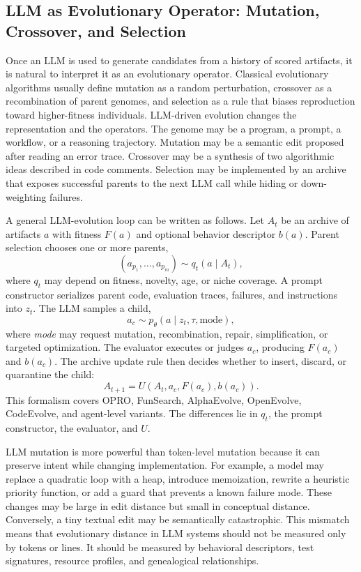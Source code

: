 \subsection{LLM as Evolutionary Operator: Mutation, Crossover, and Selection}
\label{subsec:llm-evolutionary-operator}

Once an LLM is used to generate candidates from a history of scored artifacts, it is natural to interpret it as an evolutionary operator.  Classical evolutionary algorithms usually define mutation as a random perturbation, crossover as a recombination of parent genomes, and selection as a rule that biases reproduction toward higher-fitness individuals.  LLM-driven evolution changes the representation and the operators.  The genome may be a program, a prompt, a workflow, or a reasoning trajectory.  Mutation may be a semantic edit proposed after reading an error trace.  Crossover may be a synthesis of two algorithmic ideas described in code comments.  Selection may be implemented by an archive that exposes successful parents to the next LLM call while hiding or down-weighting failures.

A general LLM-evolution loop can be written as follows.  Let $A_t$ be an archive of artifacts $a$ with fitness $F(a)$ and optional behavior descriptor $b(a)$.  Parent selection chooses one or more parents,
\begin{equation}
  (a_{p_1},\ldots,a_{p_m})\sim q_t(a\mid A_t),
\end{equation}
where $q_t$ may depend on fitness, novelty, age, or niche coverage.  A prompt constructor serializes parent code, evaluation traces, failures, and instructions into $z_t$.  The LLM samples a child,
\begin{equation}
  a_{c}\sim p_\theta(a\mid z_t, \tau, \mathrm{mode}),
\end{equation}
where \textit{mode} may request mutation, recombination, repair, simplification, or targeted optimization.  The evaluator executes or judges $a_c$, producing $F(a_c)$ and $b(a_c)$.  The archive update rule then decides whether to insert, discard, or quarantine the child:
\begin{equation}
  A_{t+1}=U(A_t,a_c,F(a_c),b(a_c)).
\end{equation}
This formalism covers OPRO, FunSearch, AlphaEvolve, OpenEvolve, CodeEvolve, and agent-level variants.  The differences lie in $q_t$, the prompt constructor, the evaluator, and $U$.

LLM mutation is more powerful than token-level mutation because it can preserve intent while changing implementation.  For example, a model may replace a quadratic loop with a heap, introduce memoization, rewrite a heuristic priority function, or add a guard that prevents a known failure mode.  These changes may be large in edit distance but small in conceptual distance.  Conversely, a tiny textual edit may be semantically catastrophic.  This mismatch means that evolutionary distance in LLM systems should not be measured only by tokens or lines.  It should be measured by behavioral descriptors, test signatures, resource profiles, and genealogical relationships.

